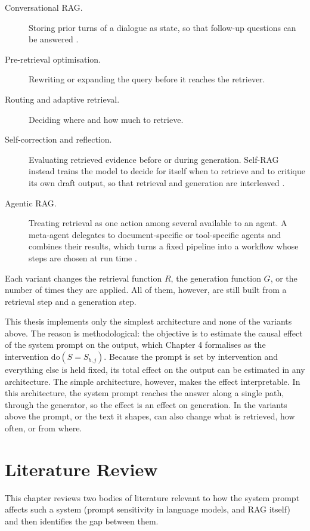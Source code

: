 \documentclass[12pt,a4paper,oneside]{scrreprt}
\begin{document}
\begin{description}
    \item[Conversational RAG.] Storing prior turns of a dialogue as state, so that follow-up questions can be answered \citep{liu2024chatqa}.
    \item[Pre-retrieval optimisation.] Rewriting or expanding the query before it reaches the retriever. 
    \item[Routing and adaptive retrieval.] Deciding where and how much to retrieve. 
    \item[Self-correction and reflection.] Evaluating retrieved evidence before or during generation. Self-RAG instead trains the model to decide for itself when to retrieve and to critique its own draft output, so that retrieval and generation are interleaved \citep{asai2024selfrag}.
    \item[Agentic RAG.] Treating retrieval as one action among several available to an agent. A meta-agent delegates to document-specific or tool-specific agents and combines their results, which turns a fixed pipeline into a workflow whose steps are chosen at run time \citep{singh2025agentic}.
\end{description}

Each variant
changes the retrieval function $R$, the generation function $G$, or the number of times they are applied. All of them, however, are still built from a retrieval step and a generation step. 

This thesis implements only the simplest architecture and none of the variants above.
The reason is methodological: the objective is to estimate the causal effect of
the system prompt on the output, which Chapter 4 formalises as the intervention
$\mathrm{do}(S = S_{b,j})$. Because the prompt is set by intervention and
everything else is held fixed, its total effect on the output can be estimated
in any architecture. The simple architecture, however, makes the effect interpretable. In this architecture, the system prompt reaches the answer along a single path, through the
generator, so the effect is an effect on generation. In the variants above the
prompt, or the text it shapes, can also change what is retrieved, how often, or from where. 
\chapter{Literature Review}

This chapter reviews two
bodies of literature relevant to how the system prompt affects such a system (prompt sensitivity in language models, and RAG itself) and then identifies the gap between them.
\end{document}
